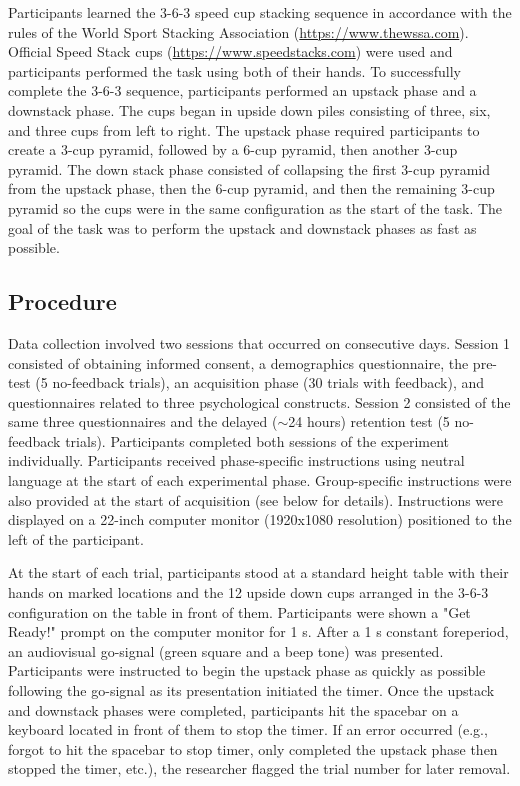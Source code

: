 \documentclass[doc,floatsintext,donotrepeattitle,letterpaper,12pt]{apa7}
\begin{document}
Participants learned the 3-6-3 speed cup stacking sequence in accordance with the rules of the World Sport Stacking Association (\url{https://www.thewssa.com}). Official Speed Stack cups (\url{https://www.speedstacks.com}) were used and participants performed the task using both of their hands. To successfully complete the 3-6-3 sequence, participants performed an upstack phase and a downstack phase. The cups began in upside down piles consisting of three, six, and three cups from left to right. The upstack phase required participants to create a 3-cup pyramid, followed by a 6-cup pyramid, then another 3-cup pyramid. The down stack phase consisted of collapsing the first 3-cup pyramid from the upstack phase, then the 6-cup pyramid, and then the remaining 3-cup pyramid so the cups were in the same configuration as the start of the task. The goal of the task was to perform the upstack and downstack phases as fast as possible.

\subsection{Procedure}

Data collection involved two sessions that occurred on consecutive days. Session 1 consisted of obtaining informed consent, a demographics questionnaire, the pre-test (5 no-feedback trials), an acquisition phase (30 trials with feedback), and questionnaires related to three psychological constructs. Session 2 consisted of the same three questionnaires and the delayed ($\sim$24 hours) retention test (5 no-feedback trials). Participants completed both sessions of the experiment individually. Participants received phase-specific instructions using neutral language at the start of each experimental phase. Group-specific instructions were also provided at the start of acquisition (see below for details). Instructions were displayed on a 22-inch computer monitor (1920x1080 resolution) positioned to the left of the participant.

At the start of each trial, participants stood at a standard height table with their hands on marked locations and the 12 upside down cups arranged in the 3-6-3 configuration on the table in front of them. Participants were shown a "Get Ready!" prompt on the computer monitor for 1 s. After a 1 s constant foreperiod, an audiovisual go-signal (green square and a beep tone) was presented. Participants were instructed to begin the upstack phase as quickly as possible following the go-signal as its presentation initiated the timer. Once the upstack and downstack phases were completed, participants hit the spacebar on a keyboard located in front of them to stop the timer. If an error occurred (e.g., forgot to hit the spacebar to stop timer, only completed the upstack phase then stopped the timer, etc.), the researcher flagged the trial number for later removal.
\end{document}
